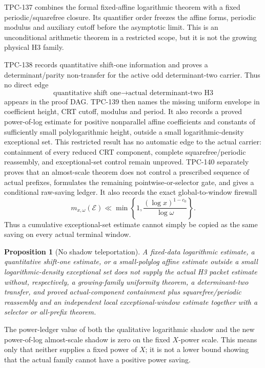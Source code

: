 \documentclass[11pt]{article}
\newtheorem{proposition}[theorem]{Proposition}
\theoremstyle{definition}
\theoremstyle{remark}
\begin{document}
TPC-137 combines the formal fixed-affine logarithmic theorem with a
fixed periodic/squarefree closure.  Its quantifier order freezes the
affine forms, periodic modulus and auxiliary cutoff before the
asymptotic limit.  This is an unconditional arithmetic theorem in a
restricted scope, but it is not the growing physical H3 family.

TPC-138 records quantitative shift-one information and proves a
determinant/parity non-transfer for the active odd determinant-two
carrier.  Thus no direct edge
\[
 \text{quantitative shift one}
 \longrightarrow
 \text{actual determinant-two H3}
\]
appears in the proof DAG.  TPC-139 then names the missing uniform
envelope in coefficient height, CRT cutoff, modulus and period.  It
also records a proved power-of-log estimate for positive nonparallel
affine coefficients and constants of sufficiently small
polylogarithmic height, outside a small logarithmic-density
exceptional set.  This restricted result has no automatic edge to the
actual carrier: containment of every reduced CRT component, complete
squarefree/periodic reassembly, and exceptional-set control remain
unproved.  TPC-140 separately proves that an almost-scale theorem does
not control a prescribed sequence of actual prefixes, formulates the
remaining pointwise-or-selector gate, and gives a conditional
raw-saving ledger.  It also records the exact global-to-window
firewall
\[
 m_{x,\omega}(\mathcal E)
 \ll
 \min\left\{1,\frac{(\log x)^{1-c_0}}{\log\omega}\right\}.
\]
Thus a cumulative exceptional-set estimate cannot simply be copied
as the same saving on every actual terminal window.

\begin{proposition}[No shadow teleportation]
\label{prop:shadow}
A fixed-data logarithmic estimate, a quantitative shift-one estimate,
or a small-polylog affine estimate outside a small
logarithmic-density exceptional set does not supply the actual H3
packet estimate without, respectively, a growing-family uniformity
theorem, a determinant-two transfer, and proved actual-component
containment plus squarefree/periodic reassembly and an independent
local exceptional-window estimate together with a selector or
all-prefix theorem.
\end{proposition}

The power-ledger value of both the qualitative logarithmic shadow and
the new power-of-log almost-scale shadow is zero on the fixed
\(X\)-power scale.  This means only that neither supplies a fixed
power of \(X\); it is not a lower bound showing that the actual family
cannot have a positive power saving.
\end{document}
